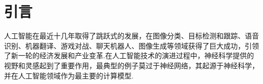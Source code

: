 \documentclass{SCIS2020cn}
\begin{document}






\section{引言}
人工智能在最近十几年取得了跳跃式的发展\cite{deep-learning-nature}，在图像分类\cite{he2015delving, szegedy2015going, he2016deep, dosovitskiy2020image}、目标检测和跟踪\cite{girshick2014rich, redmon2016you}、语音识别\cite{graves2013speech, graves2013hybrid}、机器翻译\cite{sutskever2014sequence, bahdanau2014neural, sennrich2015neural}、游戏对战\cite{mnih2015human, silver2017mastering}、聊天机器人\cite{NEURIPS2020_1457c0d6, zeng2021pangualphalargescaleautoregressivepretrained, openai2024gpt4technicalreport}、图像生成\cite{NIPS2014_5ca3e9b1, DBLP:journals/corr/RadfordMC15, Rombach_2022_CVPR}等领域获得了巨大成功，引领了新一轮的经济发展和产业变革.在人工智能技术的演进过程中，神经科学提供的视野和灵感起到了重要作用\cite{hassabis2017neuroscience, Zador2023}，最典型的例子莫过于神经网络，其起源于神经科学，并在人工智能领域作为最主要的计算模型.
\end{document}

